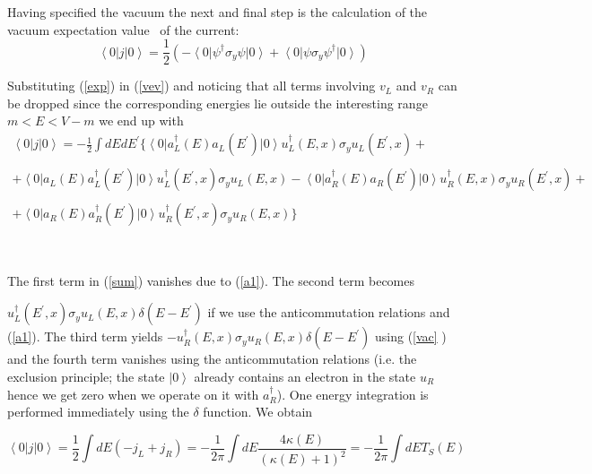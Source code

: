 \noindent Having specified the vacuum the next and final step is the
calculation of the vacuum expectation value \ of the current: 
\begin{equation}  \label{vev}
\left\langle 0\right| j\left| 0\right\rangle =\frac 12\left( -\left\langle
0\right| \psi ^{\dagger }\sigma _y\psi \left| 0\right\rangle +\left\langle
0\right| \psi \sigma _y\psi ^{\dagger }\left| 0\right\rangle \right)
\end{equation}

\noindent Substituting (\ref{exp}) in (\ref{vev}) and noticing that all
terms involving $v_L$ and $v_R$ can be dropped since the corresponding
energies lie outside the interesting range $m<E<V-m$ we end up with 
\begin{equation}  \label{sum}
\begin{array}{c}
\left\langle 0\right| j\left| 0\right\rangle =-\frac 12\int dEdE^{\prime
}\{\left\langle 0\right| a_L^{\dagger }(E)a_L(E^{\prime })\left|
0\right\rangle u_L^{\dagger }(E,x)\sigma _yu_L(E^{\prime },x)+ \\ 
\\ 
+\left\langle 0\right| a_L(E)a_L^{\dagger }(E^{\prime })\left|
0\right\rangle u_L^{\dagger }(E^{\prime },x)\sigma _yu_L(E,x)-\left\langle
0\right| a_R^{\dagger }(E)a_R(E^{\prime })\left| 0\right\rangle u_R^{\dagger
}(E,x)\sigma _yu_R(E^{\prime },x)+ \\ 
\\ 
+\left\langle 0\right| a_R(E)a_R^{\dagger }(E^{\prime })\left|
0\right\rangle u_R^{\dagger }(E^{\prime },x)\sigma _yu_R(E,x)\}
\end{array}
\end{equation}

\smallskip\ 

\noindent The first term in (\ref{sum}) vanishes due to (\ref{a1}). The
second term becomes

$u_L^{\dagger }(E^{\prime },x)\sigma _yu_L(E,x)\delta (E-E^{\prime })$ if we
use the anticommutation relations and (\ref{a1}). The third term yields $%
-u_R^{\dagger }(E,x)\sigma _yu_R(E,x)\delta (E-E^{\prime })$ using (\ref{vac}%
) and the fourth term vanishes using the anticommutation relations (i.e. the
exclusion principle; the state $\left| 0\right\rangle $ already contains an
electron in the state $u_R$ hence we get zero when we operate on it with $%
a_R^{\dagger }$). One energy integration is performed immediately using the $%
\delta $ function. We obtain

\begin{equation}
\left\langle 0\right| j\left| 0\right\rangle =\frac 12\int dE(-j_L+j_R)=-%
\frac 1{2\pi }\int dE\frac{4\kappa (E)}{(\kappa (E)+1)^2}=-\frac 1{2\pi }%
\int dET_S(E)  \label{res}
\end{equation}

